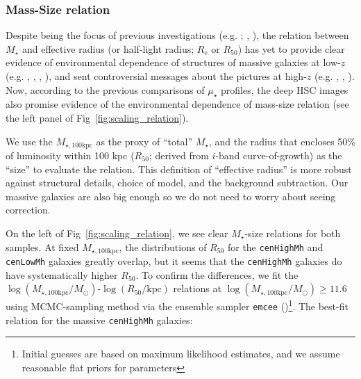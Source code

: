 \documentclass{emulateapj}
\def\rbcg{\texttt{cenHighMh}}
\def\nbcg{\texttt{cenLowMh}}
\def\mstar{{$M_{\star}$}}
\def\mtot{{$M_{\star,100\mathrm{kpc}}$}}
\def\logmtot{{$\log (M_{\star,100\mathrm{kpc}}/M_{\odot})$}}
\def\mden{{$\mu_{\star}$}}
\begin{document}
\begin{CJK*}{UTF8}{gbsn}
\subsubsection{Mass-Size relation}
    \label{sssec:mass_size}
        
    Despite being the focus of previous investigations (e.g. \citealt{Shankar2013};
    \citealt{Leja2013}, \citealt{vdWel2014}), the relation between \mstar{} and 
    effective radius (or half-light radius; $R_{\mathrm{e}}$ or $R_{\mathrm{50}}$) 
    has yet to provide clear evidence of environmental dependence of structures of 
    massive galaxies at low-$z$ (e.g. \citealt{Weinmann2009}, \citealt{Nair2010}, 
    \citealt{HCompany13}, \citealt{Cerbrian2014}), and sent controversial messages 
    about the pictures at high-$z$ (e.g. \citealt{MCooper2012}, \citealt{Papovich2012}, 
    \citealt{Kelkar2015}).
    Now, according to the previous comparisons of \mden{} profiles, the deep HSC images 
    also promise evidence of the environmental dependence of mass-size relation 
    (see the left panel of Fig~\ref{fig:scaling_relation}).
     
    We use the \mtot{} as the proxy of ``total'' \mstar{}, and the radius that encloses 
    50\% of luminosity within 100 kpc ($R_{\mathrm{50}}$; derived from $i$-band 
    curve-of-growth) as the ``size'' to evaluate the relation.
    This definition of ``effective radius'' is more robust against structural details, 
    choice of model, and the background subtraction.   
    Our massive galaxies are also big enough so we do not need to worry about seeing
    correction.
    
    On the left of Fig~\ref{fig:scaling_relation}, we see clear \mstar{}-size relations 
    for both samples.  
    At fixed \mtot{}, the distributions of $R_{\mathrm{50}}$ for the \rbcg{} and
    \nbcg{} galaxies greatly overlap, but it seems that the \rbcg{} galaxies do have 
    systematically higher $R_{\mathrm{50}}$. 
    To confirm the differences, we fit the 
    \logmtot{}-$\log (R_{\mathrm{50}}/\mathrm{kpc})$ relations at 
    \logmtot{}$\geq 11.6$ using MCMC-sampling method via the ensemble sampler 
    \texttt{emcee} (\citealt{Emcee})\footnote{Initial guesses are based on maximum 
    likelihood estimates, and we assume reasonable flat priors for parameters}.
    The best-fit relation for the massive \rbcg{} galaxies:
    

\end{CJK*}
\end{document}
